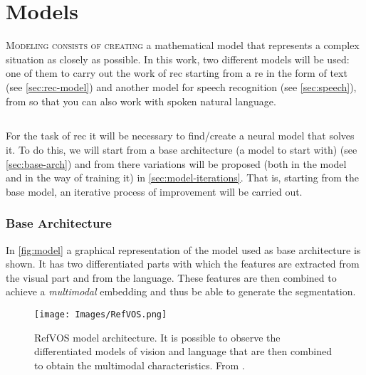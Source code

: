 

\chapter{Models}\label{cha:models}



\lettrine{M}{odeling consists of creating} a mathematical model that represents
a complex situation as closely as possible. In this work, two different models
will be used: one of them to carry out the work of \gls{rec} starting from a
\gls{re} in the form of text (see \vref{sec:rec-model}) and another model for
speech recognition (see \vref{sec:speech}), from so that you can also work with
spoken natural language.



\section{}\label{sec:rec-model}

For the task of \gls{rec} it will be necessary to find/create a neural model
that solves it. To do this, we will start from a base architecture (a model to
start with) (see \vref{sec:base-arch}) and from there variations will be
proposed (both in the model and in the way of training it) in
\vref{sec:model-iterations}. That is, starting from the base model, an
iterative process of improvement will be carried out.


\subsection{Base Architecture}\label{sec:base-arch}

In \vref{fig:model} a graphical representation of the model used as base
architecture is shown. It has two differentiated parts with which the features
are extracted from the visual part and from the language. These features are
then combined to achieve a \emph{multimodal} embedding and thus be able to
generate the segmentation.

\begin{figure}[ht]
  \centering
  \texttt{[image: Images/RefVOS.png]}
  \caption[RefVOS model architecture]{RefVOS model architecture. It is possible
    to observe the differentiated models of vision and language that are then
    combined to obtain the multimodal characteristics. From
    .}\label{fig:model}
\end{figure}

